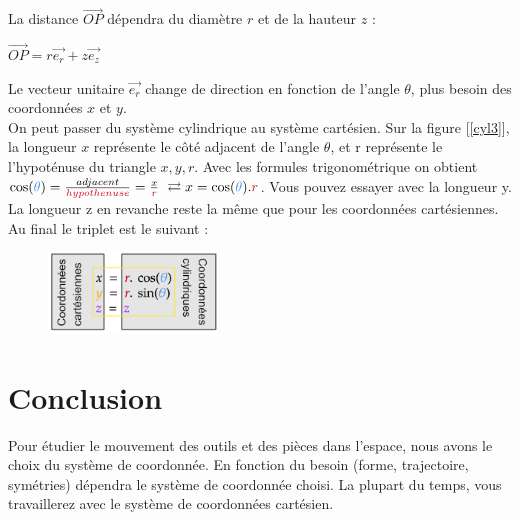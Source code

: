 \documentclass[
	11pt, %
	fleqn, %
	a4paper, %
]{LegrandOrangeBook}
\begin{document}
La distance $\Vec{OP}$ dépendra du diamètre $r$ et de la hauteur $z$ :\\
\begin{center}
$\Vec{OP}=r\Vec{e_r}+z\Vec{e_z}$
\end{center}
Le vecteur unitaire $\Vec{e_r}$ change de direction en fonction de l'angle $\theta$, plus besoin des coordonnées $x$ et $y$. \\
\noindent On peut passer du système cylindrique au système cartésien. Sur la figure [\ref{cyl3}], la longueur $x$ représente le côté adjacent de l'angle $\mathcal{\theta}$, et \textcolor[rgb]{0.82,0.01,0.11}{r} représente le l'hypoténuse du triangle $x, y, r$. Avec les formules trigonométrique on obtient 
$\cos(\textcolor[rgb]{0.29,0.56,0.89}{\theta }) =\frac{adjacent}{\textcolor[rgb]{0.82,0.01,0.11}{hypothenuse}} =\frac{x}{\textcolor[rgb]{0.82,0.01,0.11}{r}} \ \rightleftarrows x=\cos(\textcolor[rgb]{0.29,0.56,0.89}{\theta }) .\textcolor[rgb]{0.82,0.01,0.11}{r}$. Vous pouvez essayer avec la longueur \textcolor[rgb]{0.96,0.65,0.14}{y}. La longueur \textcolor[rgb]{0.56,0.07,1}{z} en revanche reste la même que pour les coordonnées cartésiennes. Au final le triplet est le suivant :   \\

\begin{figure}[H] %
	\includegraphics[width=0.4\textwidth]{Images/coordc.png} %
\end{figure}











\section{Conclusion}

Pour étudier le mouvement des outils et des pièces dans l'espace, nous avons le choix du système de coordonnée. En fonction du besoin (forme, trajectoire, symétries) dépendra le système de coordonnée choisi. La plupart du temps, vous travaillerez avec le système de coordonnées cartésien. 
\end{document}

